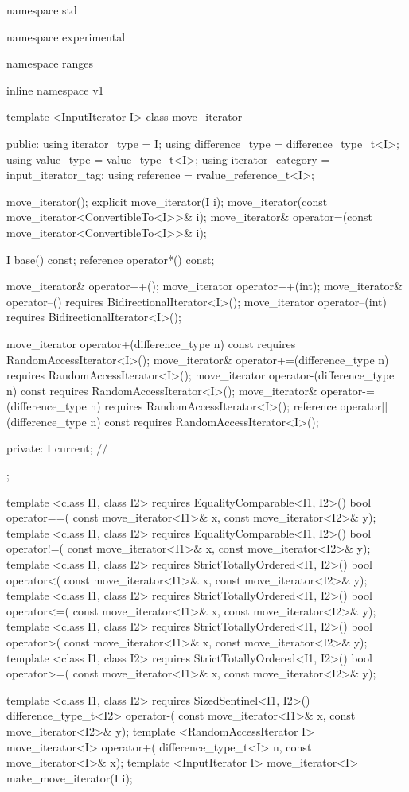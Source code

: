 \exitexample

%
\begin{codeblock}
namespace std { namespace experimental { namespace ranges { inline namespace v1 {
  template <InputIterator I>
  class move_iterator {
  public:
    using iterator_type     = I;
    using difference_type   = difference_type_t<I>;
    using value_type        = value_type_t<I>;
    using iterator_category = input_iterator_tag;
    using reference         = rvalue_reference_t<I>;

    move_iterator();
    explicit move_iterator(I i);
    move_iterator(const move_iterator<ConvertibleTo<I>>& i);
    move_iterator& operator=(const move_iterator<ConvertibleTo<I>>& i);

    I base() const;
    reference operator*() const;

    move_iterator& operator++();
    move_iterator operator++(int);
    move_iterator& operator--()
      requires BidirectionalIterator<I>();
    move_iterator operator--(int)
      requires BidirectionalIterator<I>();

    move_iterator operator+(difference_type n) const
      requires RandomAccessIterator<I>();
    move_iterator& operator+=(difference_type n)
      requires RandomAccessIterator<I>();
    move_iterator operator-(difference_type n) const
      requires RandomAccessIterator<I>();
    move_iterator& operator-=(difference_type n)
      requires RandomAccessIterator<I>();
    reference operator[](difference_type n) const
      requires RandomAccessIterator<I>();

  private:
    I current; // \expos
  };

  template <class I1, class I2>
      requires EqualityComparable<I1, I2>()
    bool operator==(
      const move_iterator<I1>& x, const move_iterator<I2>& y);
  template <class I1, class I2>
      requires EqualityComparable<I1, I2>()
    bool operator!=(
      const move_iterator<I1>& x, const move_iterator<I2>& y);
  template <class I1, class I2>
      requires StrictTotallyOrdered<I1, I2>()
    bool operator<(
      const move_iterator<I1>& x, const move_iterator<I2>& y);
  template <class I1, class I2>
      requires StrictTotallyOrdered<I1, I2>()
    bool operator<=(
      const move_iterator<I1>& x, const move_iterator<I2>& y);
  template <class I1, class I2>
      requires StrictTotallyOrdered<I1, I2>()
    bool operator>(
      const move_iterator<I1>& x, const move_iterator<I2>& y);
  template <class I1, class I2>
      requires StrictTotallyOrdered<I1, I2>()
    bool operator>=(
      const move_iterator<I1>& x, const move_iterator<I2>& y);

  template <class I1, class I2>
      requires SizedSentinel<I1, I2>()
    difference_type_t<I2> operator-(
      const move_iterator<I1>& x,
      const move_iterator<I2>& y);
  template <RandomAccessIterator I>
    move_iterator<I>
      operator+(
        difference_type_t<I> n,
        const move_iterator<I>& x);
  template <InputIterator I>
    move_iterator<I> make_move_iterator(I i);
}}}}
\end{codeblock}

